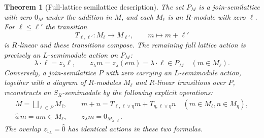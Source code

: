 \documentclass[11pt,a4paper]{article}
\newtheorem{theorem}{Theorem}[section]
\theoremstyle{definition}\newtheorem{definition}[theorem]{Definition}
\begin{document}
\begin{theorem}[Full-lattice semilattice description]\label{sh:modules}
The set $P_M$ is a join-semilattice with zero $0_M$ under the
addition in $M$, and each $M_\ell$ is an $R$-module with zero
$\ell$. For $\ell\le\ell'$ the transition
\begin{equation}\tag{SH11}\label{sh:transport}
 T_{\ell,\ell'}:M_\ell\to M_{\ell'},\qquad
 m\mapsto m+\ell'
\end{equation}
is $R$-linear and these transitions compose. The remaining full
lattice action is precisely an $L$-semimodule action on $P_M$:
\begin{equation}\tag{SH12}\label{sh:laction}
 \lambda\cdot\ell=z_\lambda\ell,\qquad
 z_\lambda m=z_\lambda(em)=\lambda\cdot\ell\in P_M
 \quad(m\in M_\ell).
\end{equation}
Conversely, a join-semilattice $P$ with zero carrying an
$L$-semimodule action, together with a diagram of $R$-modules
$M_\ell$ and $R$-linear transitions over $P$, reconstructs an
$S_R$-semimodule by the following explicit operations:
\begin{equation}\tag{SH13}\label{sh:reconstruction}
 \begin{gathered}
 M=\bigsqcup_{\ell\in P}M_\ell,\qquad
 m+n=T_{\ell,\ell\vee\eta}m+
             T_{\eta,\ell\vee\eta}n
       \quad(m\in M_\ell,n\in M_\eta),\\
 \widehat a\,m=am\in M_\ell,\qquad
 z_\lambda m=0_{M_{\lambda\cdot\ell}}.
 \end{gathered}
\end{equation}
The overlap $z_{1_L}=\widehat0$ has identical actions in these
two formulas.
\end{theorem}
\end{document}
